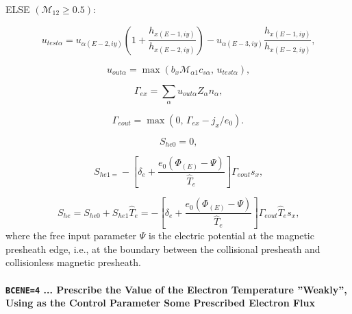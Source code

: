 \documentclass[11pt]{article}
\begin{document}
\bigskip

ELSE $\left( \mathcal{M}_{12}\geq0.5\right) $:

\begin{equation}
u_{test\alpha}=u_{\alpha\left( E-2,iy\right) }\left( 1+\frac{h_{x\left(
E-1,iy\right) }}{h_{x\left( E-2,iy\right) }}\right) -u_{\alpha\left(
E-3,iy\right) }\frac{h_{x\left( E-1,iy\right) }}{h_{x\left( E-2,iy\right) }}%
\text{,}   \label{c192}
\end{equation}

\begin{equation}
u_{out\alpha}=\max\left( b_{x}\mathcal{M}_{\alpha1}c_{s\alpha}\text{, }%
u_{test\alpha}\right) \text{,}   \label{c193}
\end{equation}

\begin{equation}
\Gamma_{ex}=\sum_{\alpha}u_{out\alpha}Z_{\alpha}n_{\alpha}\text{,} 
\label{c194}
\end{equation}

\begin{equation}
\Gamma_{eout}=\max\left( 0\text{, }\Gamma_{ex}-j_{x}/e_{0}\right) \text{.} 
\label{c195}
\end{equation}

\bigskip

\begin{equation}
S_{he0}=0\text{,}   \label{c196}
\end{equation}

\begin{equation}
S_{he1=}-\left[ \delta_{e}+\frac{e_{0}\left( \Phi_{\left( E\right)
}-\Psi\right) }{\widehat{T}_{e}}\right] \Gamma_{eout}s_{x}\text{,} 
\label{c197}
\end{equation}

\begin{equation}
S_{he}=S_{he0}+S_{he1}\widehat{T}_{e}=-\left[ \delta_{e}+\frac{e_{0}\left(
\Phi_{\left( E\right) }-\Psi\right) }{\widehat{T}_{e}}\right] \Gamma_{eout}%
\widehat{T}_{e}s_{x}\text{,}   \label{c198}
\end{equation}
where the free input parameter $\Psi$ is the electric potential at the
magnetic presheath edge, i.e., at the boundary between the collisional
presheath and collisionless magnetic presheath.

\bigskip

\paragraph{\texttt{BCENE=4} ... Prescribe the Value of the Electron
Temperature ''Weakly'', Using as the Control Parameter Some Prescribed
Electron Flux}
\end{document}
